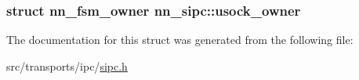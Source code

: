 \subsubsection[{usock\+\_\+owner}]{\setlength{\rightskip}{0pt plus 5cm}struct {\bf nn\+\_\+fsm\+\_\+owner} nn\+\_\+sipc\+::usock\+\_\+owner}\hypertarget{structnn__sipc_a5f5d602ecba8aabe32671874b2e40adb}{}\label{structnn__sipc_a5f5d602ecba8aabe32671874b2e40adb}


The documentation for this struct was generated from the following file\+:\begin{DoxyCompactItemize}
\item 
src/transports/ipc/\hyperlink{sipc_8h}{sipc.\+h}\end{DoxyCompactItemize}

